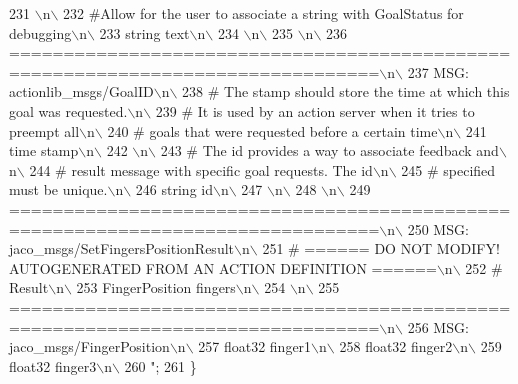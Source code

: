 \begin{DoxyCode}
231 \textcolor{stringliteral}{\(\backslash\)n\(\backslash\)}
232 \textcolor{stringliteral}{#Allow for the user to associate a string with GoalStatus for debugging\(\backslash\)n\(\backslash\)}
233 \textcolor{stringliteral}{string text\(\backslash\)n\(\backslash\)}
234 \textcolor{stringliteral}{\(\backslash\)n\(\backslash\)}
235 \textcolor{stringliteral}{\(\backslash\)n\(\backslash\)}
236 \textcolor{stringliteral}{================================================================================\(\backslash\)n\(\backslash\)}
237 \textcolor{stringliteral}{MSG: actionlib\_msgs/GoalID\(\backslash\)n\(\backslash\)}
238 \textcolor{stringliteral}{# The stamp should store the time at which this goal was requested.\(\backslash\)n\(\backslash\)}
239 \textcolor{stringliteral}{# It is used by an action server when it tries to preempt all\(\backslash\)n\(\backslash\)}
240 \textcolor{stringliteral}{# goals that were requested before a certain time\(\backslash\)n\(\backslash\)}
241 \textcolor{stringliteral}{time stamp\(\backslash\)n\(\backslash\)}
242 \textcolor{stringliteral}{\(\backslash\)n\(\backslash\)}
243 \textcolor{stringliteral}{# The id provides a way to associate feedback and\(\backslash\)n\(\backslash\)}
244 \textcolor{stringliteral}{# result message with specific goal requests. The id\(\backslash\)n\(\backslash\)}
245 \textcolor{stringliteral}{# specified must be unique.\(\backslash\)n\(\backslash\)}
246 \textcolor{stringliteral}{string id\(\backslash\)n\(\backslash\)}
247 \textcolor{stringliteral}{\(\backslash\)n\(\backslash\)}
248 \textcolor{stringliteral}{\(\backslash\)n\(\backslash\)}
249 \textcolor{stringliteral}{================================================================================\(\backslash\)n\(\backslash\)}
250 \textcolor{stringliteral}{MSG: jaco\_msgs/SetFingersPositionResult\(\backslash\)n\(\backslash\)}
251 \textcolor{stringliteral}{# ====== DO NOT MODIFY! AUTOGENERATED FROM AN ACTION DEFINITION ======\(\backslash\)n\(\backslash\)}
252 \textcolor{stringliteral}{# Result\(\backslash\)n\(\backslash\)}
253 \textcolor{stringliteral}{FingerPosition fingers\(\backslash\)n\(\backslash\)}
254 \textcolor{stringliteral}{\(\backslash\)n\(\backslash\)}
255 \textcolor{stringliteral}{================================================================================\(\backslash\)n\(\backslash\)}
256 \textcolor{stringliteral}{MSG: jaco\_msgs/FingerPosition\(\backslash\)n\(\backslash\)}
257 \textcolor{stringliteral}{float32 finger1\(\backslash\)n\(\backslash\)}
258 \textcolor{stringliteral}{float32 finger2\(\backslash\)n\(\backslash\)}
259 \textcolor{stringliteral}{float32 finger3\(\backslash\)n\(\backslash\)}
260 \textcolor{stringliteral}{"};
261   \}
\end{DoxyCode}
